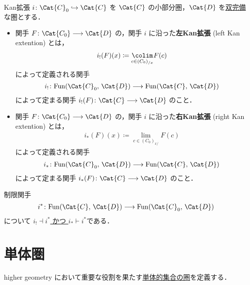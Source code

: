 \documentclass[TQFT_main]{subfiles}
\begin{document}
\begin{mydef}[label=def:Kanext]{Kan拡張}
    $i \colon \Cat{C}_0 \hookrightarrow \Cat{C}$ を $\Cat{C}$ の小部分圏，$\Cat{D}$ を\hyperref[def:complete]{双完備}な圏とする．
    \begin{itemize}
        \item 関手 $F \colon \Cat{C_0} \lto \Cat{D}$ の，関手 $i$ に沿った\textbf{左Kan拡張} (left Kan extention) とは，
        \begin{align}
            i_{!} (F)(x) \coloneqq \underset{c \in (C_0)_{/x}}{\colim} F(c)
        \end{align}
        によって定義される関手
        \begin{align}
            i_{!} \colon \mathrm{Fun} (\Cat{C}_0,\, \Cat{D}) \lto \mathrm{Fun} (\Cat{C},\, \Cat{D})
        \end{align}
        によって定まる関手 $i_!(F) \colon \Cat{C} \lto \Cat{D}$ のこと． 
        \item   関手 $F \colon \Cat{C_0} \lto \Cat{D}$ の，関手 $i$ に沿った\textbf{右Kan拡張} (right Kan extention) とは，
        \begin{align}
            i_{*} (F)(x) \coloneqq \underset{c \in (C_0)_{x/}}{\lim} F(c)
        \end{align}
        によって定義される関手
        \begin{align}
            i_{*} \colon \mathrm{Fun} (\Cat{C}_0,\, \Cat{D}) \lto \mathrm{Fun} (\Cat{C},\, \Cat{D})
        \end{align}
        によって定まる関手 $i_*(F) \colon \Cat{C} \lto \Cat{D}$ のこと． 
    \end{itemize}
    
\end{mydef}
制限関手
\begin{align}
    i^* \colon \mathrm{Fun} (\Cat{C},\, \Cat{D}) \lto \mathrm{Fun} (\Cat{C}_0,\, \Cat{D})
\end{align}
について \hyperref[def:adjoint]{$i_{!} \dashv i^*$ かつ $i_* \vdash i^*$}である．

\section{単体圏}

higher geometry において重要な役割を果たす\hyperref[def:SimpSet]{単体的集合の圏}を定義する．
\end{document}
